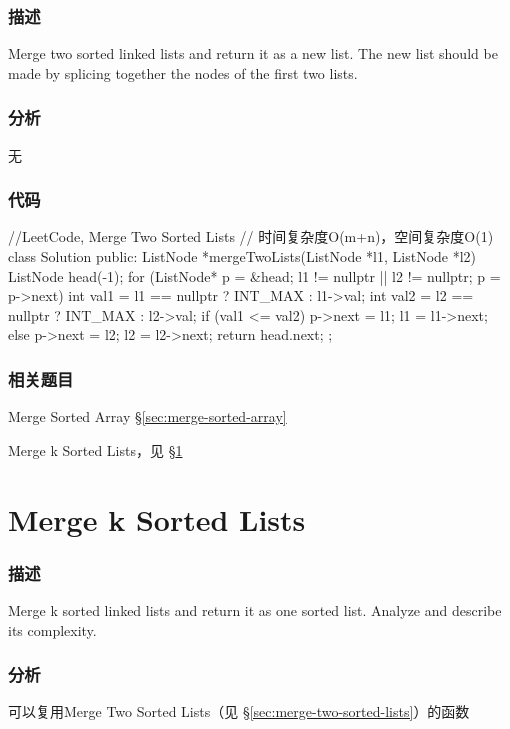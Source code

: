 \subsubsection{描述}
Merge two sorted linked lists and return it as a new list. The new list should be made by splicing together the nodes of the first two lists.


\subsubsection{分析}
无


\subsubsection{代码}
\begin{Code}
//LeetCode, Merge Two Sorted Lists
// 时间复杂度O(m+n)，空间复杂度O(1)
class Solution {
public:
    ListNode *mergeTwoLists(ListNode *l1, ListNode *l2) {
        ListNode head(-1);
        for (ListNode* p = &head; l1 != nullptr || l2 != nullptr; p = p->next) {
            int val1 = l1 == nullptr ? INT_MAX : l1->val;
            int val2 = l2 == nullptr ? INT_MAX : l2->val;
            if (val1 <= val2) {
                p->next = l1;
                l1 = l1->next;
            } else {
                p->next = l2;
                l2 = l2->next;
            }
        }
        return head.next;
    }
};
\end{Code}


\subsubsection{相关题目}
\begindot
\item Merge Sorted Array \S \ref{sec:merge-sorted-array}
\item Merge k Sorted Lists，见 \S \ref{sec:merge-k-sorted-lists}
\myenddot


\section{Merge k Sorted Lists} %
\label{sec:merge-k-sorted-lists}


\subsubsection{描述}
Merge k sorted linked lists and return it as one sorted list. Analyze and describe its complexity.


\subsubsection{分析}
可以复用Merge Two Sorted Lists（见 \S \ref{sec:merge-two-sorted-lists}）的函数


